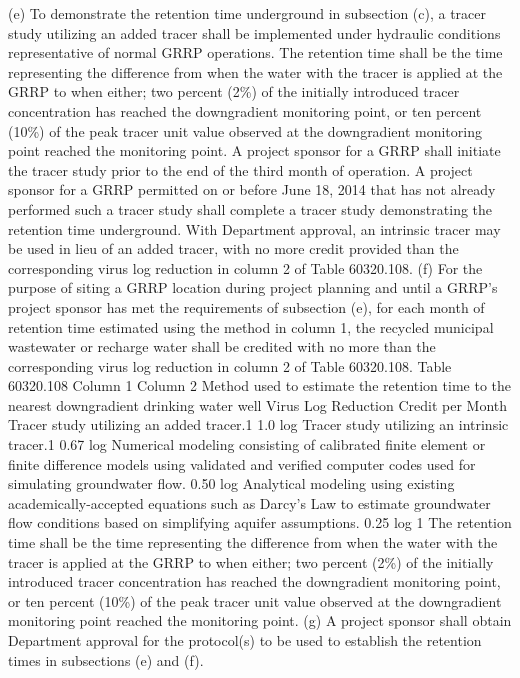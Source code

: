 (e) To demonstrate the retention time underground in subsection (c), a tracer study utilizing an added tracer shall be implemented under hydraulic conditions representative of normal GRRP operations. The retention time shall be the time representing the difference from when the water with the tracer is applied at the GRRP to when either; two percent (2\%) of the initially introduced tracer concentration has reached the downgradient monitoring point, or ten percent (10\%) of the peak tracer unit value observed at the downgradient monitoring point reached the monitoring point. A project sponsor for a GRRP shall initiate the tracer study prior to the end of the third month of operation. A project sponsor for a GRRP permitted on or before June 18, 2014 that has not already performed such a tracer study shall complete a tracer study demonstrating the retention time underground. With Department approval, an intrinsic tracer may be used in lieu of an added tracer, with no more credit provided than the corresponding virus log reduction in column 2 of Table 60320.108.
(f) For the purpose of siting a GRRP location during project planning and until a GRRP's project sponsor has met the requirements of subsection (e), for each month of retention time estimated using the method in column 1, the recycled municipal wastewater or recharge water shall be credited with no more than the corresponding virus log reduction in column 2 of Table 60320.108.
Table 60320.108
Column 1
Column 2
Method used to estimate the retention time to the nearest downgradient drinking water well
Virus Log Reduction Credit per Month
Tracer study utilizing an added tracer.1
1.0 log
Tracer study utilizing an intrinsic tracer.1
0.67 log
Numerical modeling consisting of calibrated finite element or finite difference models using validated and verified computer codes used for simulating groundwater flow.
0.50 log
Analytical modeling using existing academically-accepted equations such as Darcy's Law to estimate groundwater flow conditions based on simplifying aquifer assumptions.
0.25 log
1 The retention time shall be the time representing the difference from when the water with the tracer is applied at the GRRP to when either; two percent (2\%) of the initially introduced tracer concentration has reached the downgradient monitoring point, or ten percent (10\%) of the peak tracer unit value observed at the downgradient monitoring point reached the monitoring point.
(g) A project sponsor shall obtain Department approval for the protocol(s) to be used to establish the retention times in subsections (e) and (f).
